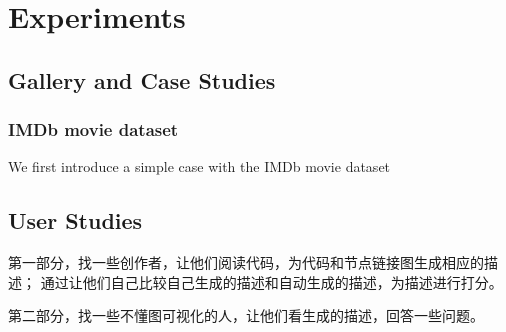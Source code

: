 \section{Experiments}
\subsection{Gallery and Case Studies}
\subsubsection{IMDb movie dataset}
We first introduce a simple case with the IMDb movie dataset~\cite{}

\subsection{User Studies}
第一部分，找一些创作者，让他们阅读代码，为代码和节点链接图生成相应的描述；
通过让他们自己比较自己生成的描述和自动生成的描述，为描述进行打分。

第二部分，找一些不懂图可视化的人，让他们看生成的描述，回答一些问题。